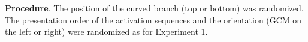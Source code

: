 \documentclass[10pt,letterpaper]{article}
\begin{document}


\textbf{Procedure}. 
The position of the curved branch (top or bottom) was randomized. The presentation order of the activation sequences and the orientation (GCM on the left or right) were randomized as for Experiment 1.


\end{document}
